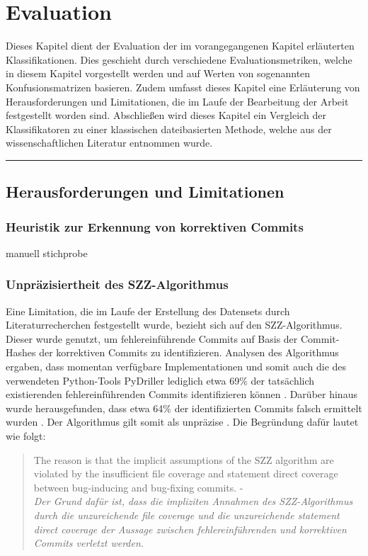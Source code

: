 
\chapter{Evaluation}
\label{evaluation}

Dieses Kapitel dient der Evaluation der im vorangegangenen Kapitel erläuterten Klassifikationen. Dies geschieht durch verschiedene Evaluationsmetriken, welche in diesem Kapitel vorgestellt werden und auf Werten von sogenannten Konfusionsmatrizen basieren. Zudem umfasst dieses Kapitel eine Erläuterung von Herausforderungen und Limitationen, die im Laufe der Bearbeitung der Arbeit festgestellt worden sind. Abschließen wird dieses Kapitel ein Vergleich der Klassifikatoren zu einer klassischen dateibasierten Methode, welche aus der wissenschaftlichen Literatur entnommen wurde.
\\
\hrule

\section{Herausforderungen und Limitationen}

\subsection*{Heuristik zur Erkennung von korrektiven Commits}
manuell
stichprobe

\subsection*{Unpräzisiertheit des SZZ-Algorithmus}

Eine Limitation, die im Laufe der Erstellung des Datensets durch Literaturrecherchen festgestellt wurde, bezieht sich auf den SZZ-Algorithmus. Dieser wurde genutzt, um fehlereinführende Commits auf Basis der Commit-Hashes der korrektiven Commits zu identifizieren. Analysen des Algorithmus ergaben, dass momentan verfügbare Implementationen und somit auch die des verwendeten Python-Tools PyDriller lediglich etwa 69\% der tatsächlich existierenden fehlereinführenden Commits identifizieren können \cite{Wen2019}. Darüber hinaus wurde herausgefunden, dass etwa 64\% der identifizierten Commits falsch ermittelt wurden \cite{Wen2019}. Der Algorithmus gilt somit als unpräzise \cite{Wen2019}. Die Begründung dafür lautet wie folgt:

\begin{quotation}
The reason is that the implicit assumptions of the SZZ algorithm
are violated by the insufficient file coverage and statement direct
coverage between bug-inducing and bug-fixing commits. - \cite{Wen2019}
\medskip \\
\textit{Der Grund dafür ist, dass die impliziten Annahmen des SZZ-Algorithmus durch die unzureichende \glqq file coverage\grqq{} und die unzureichende \glqq statement direct
coverage\grqq{} der Aussage zwischen fehlereinführenden und korrektiven Commits verletzt werden.}
\end{quotation}

